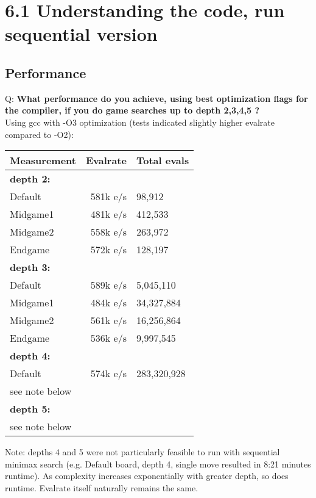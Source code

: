 \section*{6.1 Understanding the code, run sequential version}

\subsection*{Performance}
Q: \textbf{What performance do you achieve, using best optimization flags for the compiler, if you do game searches up to depth 2,3,4,5 ?} \\

Using gcc with -O3 optimization (tests indicated slightly higher evalrate compared to -O2): 
\begin{center}

  \begin{tabular} {|l|r|l|}
    \hline
    \textbf{Measurement} & \textbf{Evalrate} & \textbf{Total evals} \\ \hline
    \textbf{depth 2:} &  &  \\ \hline
    Default & 581k e/s & 98,912 \\ \hline
    Midgame1 & 481k e/s & 412,533 \\ \hline
    Midgame2 & 558k e/s & 263,972 \\ \hline
    Endgame & 572k e/s & 128,197 \\ \hline
    \textbf{depth 3:} &  &  \\ \hline
    Default & 589k e/s & 5,045,110 \\ \hline
    Midgame1 & 484k e/s & 34,327,884 \\ \hline
    Midgame2 & 561k e/s & 16,256,864 \\ \hline
    Endgame & 536k e/s & 9,997,545 \\ \hline
    \textbf{depth 4:} &  &  \\ \hline
    Default & 574k e/s & 283,320,928 \\ \hline
    see note below &  &  \\ \hline
    \textbf{depth 5:} &  &  \\ \hline
    see note below &  &  \\ \hline
  \end{tabular}

\end{center}
Note: depths 4 and 5 were not particularly feasible to run with sequential minimax search (e.g. Default board, depth 4, single move resulted in 8:21 minutes runtime). As complexity increases exponentially with greater depth, so does runtime. Evalrate itself naturally remains the same.
